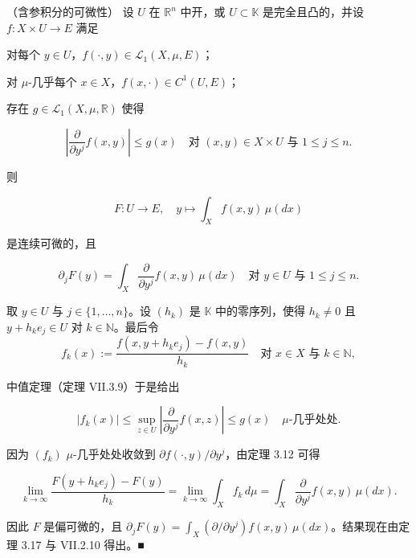 \begin{theorem}

（含参积分的可微性） 设 $ U $ 在 $ \mathbb{R}^n $ 中开，或 $ U \subset \mathbb{K} $ 是完全且凸的，并设 $ f: X \times U \to E $ 满足

\begin{items}
\item

对每个 $ y \in U $，$ f(\cdot,y) \in \mathcal{L}_1(X,\mu,E) $；

\item

对 $ \mu $-几乎每个 $ x \in X $，$ f(x,\cdot) \in C^1(U,E) $；

\item

存在 $ g \in \mathcal{L}_1(X,\mu,\mathbb{R}) $ 使得

\[
\left| \frac{\partial}{\partial y^j} f(x,y) \right| \le g(x) \quad \text{对 } (x,y) \in X \times U \text{ 与 } 1 \le j \le n.
\]

则

\[
F: U \to E, \quad y \mapsto \int_X f(x,y) \, \mu(dx)
\]

是连续可微的，且

\[
\partial_j F(y) = \int_X \frac{\partial}{\partial y^j} f(x,y) \, \mu(dx) \quad \text{对 } y \in U \text{ 与 } 1 \le j \le n.
\]

\proofhead
取 $ y \in U $ 与 $ j \in \{1,\ldots,n\} $。设 $ (h_k) $ 是 $ \mathbb{K} $ 中的零序列，使得 $ h_k \ne 0 $ 且 $ y + h_k e_j \in U $ 对 $ k \in \mathbb{N} $。最后令
\[
f_k(x) := \frac{f(x, y + h_k e_j) - f(x, y)}{h_k} \quad \text{对 } x \in X \text{ 与 } k \in \mathbb{N},
\]

中值定理（定理 VII.3.9）于是给出

\[
|f_k(x)| \le \sup_{z \in U} \left| \frac{\partial}{\partial y^j} f(x,z) \right| \le g(x) \quad \mu\text{-几乎处处}.
\]

因为 $ (f_k) $ $ \mu $-几乎处处收敛到 $ \partial f(\cdot,y)/\partial y^j $，由定理 3.12 可得

\[
\lim_{k \to \infty} \frac{F(y + h_k e_j) - F(y)}{h_k} = \lim_{k \to \infty} \int_X f_k \, d\mu = \int_X \frac{\partial}{\partial y^j} f(x,y) \, \mu(dx).
\]

因此 $ F $ 是偏可微的，且 $ \partial_j F(y) = \int_X (\partial/\partial y^j) f(x,y) \, \mu(dx) $。结果现在由定理 3.17 与 VII.2.10 得出。\nobreak\hspace{0.35em}■

\end{items}

\end{theorem}

